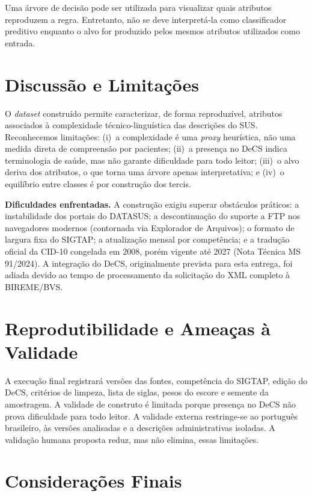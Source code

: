 \documentclass[12pt]{article}
\begin{document}
Uma árvore de decisão pode ser utilizada para visualizar quais atributos
reproduzem a regra. Entretanto, não se deve interpretá-la como classificador
preditivo enquanto o alvo for produzido pelos mesmos atributos utilizados
como entrada.

\section{Discussão e Limitações}

O \textit{dataset} construído permite caracterizar, de forma reproduzível,
atributos associados à complexidade técnico-linguística das descrições do
SUS. Reconhecemos limitações: (i)~a complexidade é uma \textit{proxy}
heurística, não uma medida direta de compreensão por pacientes;
(ii)~a presença no DeCS indica terminologia de saúde, mas não garante
dificuldade para todo leitor; (iii)~o alvo deriva dos atributos, o que torna
uma árvore apenas interpretativa; e (iv)~o equilíbrio entre classes é por
construção dos tercis.

\textbf{Dificuldades enfrentadas.} A construção exigiu superar obstáculos
práticos: a instabilidade dos portais do DATASUS; a descontinuação do
suporte a FTP nos navegadores modernos (contornada via Explorador de
Arquivos); o formato de largura fixa do SIGTAP; a atualização mensal por
competência; e a tradução oficial da CID-10 congelada em 2008, porém
vigente até 2027 (Nota Técnica MS 91/2024). A integração do DeCS, originalmente
prevista para esta entrega, foi adiada devido ao tempo de processamento da
solicitação do XML completo à BIREME/BVS.

\section{Reprodutibilidade e Ameaças à Validade}

A execução final registrará versões das fontes, competência do SIGTAP, edição
do DeCS, critérios de limpeza, lista de siglas, pesos do escore e semente da
amostragem. A validade de construto é limitada porque presença no DeCS não
prova dificuldade para todo leitor. A validade externa restringe-se ao
português brasileiro, às versões analisadas e a descrições administrativas
isoladas. A validação humana proposta reduz, mas não elimina, essas
limitações.

\section{Considerações Finais}
\end{document}
